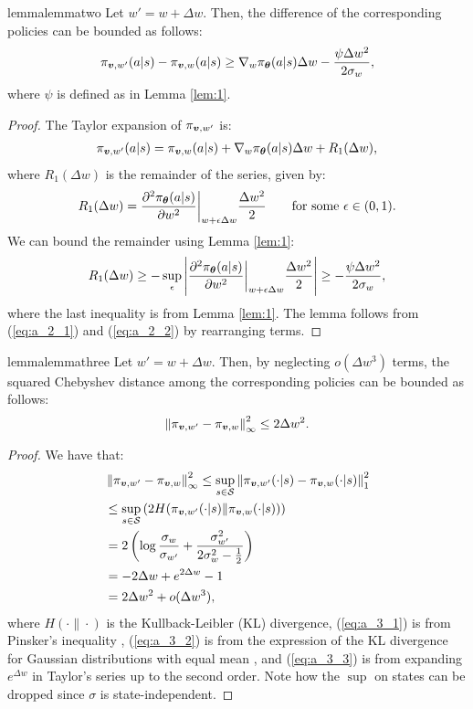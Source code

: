 \begin{restatable}[]{lemma}{lemmatwo}\label{lem:2}
Let $w' = w + \Delta w$. Then, the difference of the corresponding policies can be bounded as follows:
\[
	\pi_{\vv,w'}(a\vert s) - \pi_{\vv,w}(a\vert s) \geq \nabla_w \policy \Delta w - \frac{\psi\Delta w^2}{2\sigma_w}, 
\]
where $\psi$ is defined as in Lemma \ref{lem:1}.
\end{restatable}
\begin{proof}
The Taylor expansion of $\pi_{\vv,w'}$ is:
\begin{align}\label{eq:a_2_1}
	\pi_{\vv,w'}(a\vert s) = \pi_{\vv,w}(a\vert s) + \nabla_w \policy\Delta w + R_1(\Delta w),
\end{align}
where $R_1(\Delta w)$ is the remainder of the series, given by:
\[
	R_1(\Delta w) = \frac{\partial^2\policy}{\partial w^2}\biggr\rvert_{w + \epsilon\Delta{w}}\frac{\Delta w^2}{2} \qquad \text{for some $\epsilon\in(0,1)$}.
\]
We can bound the remainder using Lemma \ref{lem:1}:
\begin{align}\label{eq:a_2_2}
	R_1(\Delta w) \geq  - \sup_{\epsilon}\left|\frac{\partial^2 \policy}{\partial w^2}\biggr\rvert_{w + \epsilon\Delta{w}}\frac{\Delta w^2}{2}\right| \geq -\frac{\psi\Delta w^2}{2\sigma_w},	
\end{align}
where the last inequality is from Lemma \ref{lem:1}. The lemma follows from (\ref{eq:a_2_1}) and (\ref{eq:a_2_2}) by rearranging terms.
\end{proof}


\begin{restatable}[]{lemma}{lemmathree}\label{lem:3}
Let $w' = w + \Delta w$. Then, by neglecting $o(\Delta w^3)$ terms, the squared Chebyshev distance among the corresponding policies can be bounded as follows:
\[
	\norm[\infty]{\pi_{\vv,w'} - \pi_{\vv,w}}^2 \leq 2\Delta w^2.
\]
\end{restatable}
\begin{proof}
We have that:
\begin{align}
	&\norm[\infty]{\pi_{\vv,w'} - \pi_{\vv,w}}^2 
	\leq \sup_{s\in\Sspace}\norm[1]{\pi_{\vv,w'}(\cdot\vert s) - \pi_{\vv,w}(\cdot\vert s)}^2 \nonumber\\
	&\leq \sup_{s\in\Sspace}\left(2H(\pi_{\vv,w'}(\cdot\vert s) \| \pi_{\vv,w}(\cdot\vert s))\right)\label{eq:a_3_1}\\
	&=2\left(\log\frac{\sigma_w}{\sigma_{w'}} + \frac{\sigma_{w'}^2}{2\sigma_w^2 - \frac{1}{2}}\right)\label{eq:a_3_2}\\
	&=-2\Delta w  + e^{2\Delta w} - 1 \label{eq:a_3_3}\\
	&=2\Delta w^2  + o(\Delta w^3),\nonumber
\end{align}
where $H(\cdot\|\cdot)$ is the Kullback-Leibler (KL) divergence, (\ref{eq:a_3_1}) is from Pinsker's inequality \cite{pinsker1960information}, (\ref{eq:a_3_2}) is from the expression of the KL divergence for Gaussian distributions with equal mean \cite{gil2013renyi}, 
and (\ref{eq:a_3_3}) is from expanding $e^{\Delta w}$ in Taylor's series up to the second order. 
Note how the $\sup$ on states can be dropped since $\sigma$ is state-independent.
\end{proof}


